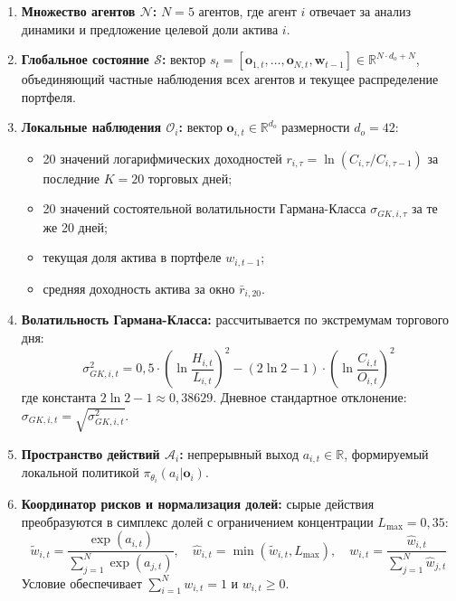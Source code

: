 \documentclass[11pt,a4paper]{article}
\begin{document}
\begin{enumerate}[leftmargin=*]
\item \textbf{Множество агентов $\mathcal{N}$:} $N = 5$ агентов, где агент $i$ отвечает за анализ динамики и предложение целевой доли актива $i$.

\item \textbf{Глобальное состояние $\mathcal{S}$:} вектор $s_t = [\mathbf{o}_{1, t}, \dots, \mathbf{o}_{N, t}, \mathbf{w}_{t-1}] \in \mathbb{R}^{N \cdot d_o + N}$, объединяющий частные наблюдения всех агентов и текущее распределение портфеля.

\item \textbf{Локальные наблюдения $\mathcal{O}_i$:} вектор $\mathbf{o}_{i, t} \in \mathbb{R}^{d_o}$ размерности $d_o = 42$:
\begin{itemize}
\item 20 значений логарифмических доходностей $r_{i, \tau} = \ln(C_{i, \tau} / C_{i, \tau-1})$ за последние $K=20$ торговых дней;
\item 20 значений состоятельной волатильности Гармана-Класса $\sigma_{GK, i, \tau}$ за те же 20 дней;
\item текущая доля актива в портфеле $w_{i, t-1}$;
\item средняя доходность актива за окно $\bar{r}_{i, 20}$.
\end{itemize}

\item \textbf{Волатильность Гармана-Класса:} рассчитывается по экстремумам торгового дня:
$$\sigma_{GK, i, t}^2 = 0{,}5 \cdot \left( \ln \frac{H_{i, t}}{L_{i, t}} \right)^2 - (2\ln 2 - 1) \cdot \left( \ln \frac{C_{i, t}}{O_{i, t}} \right)^2$$
где константа $2\ln 2 - 1 \approx 0{,}38629$. Дневное стандартное отклонение: $\sigma_{GK, i, t} = \sqrt{\sigma_{GK, i, t}^2}$.

\item \textbf{Пространство действий $\mathcal{A}_i$:} непрерывный выход $a_{i, t} \in \mathbb{R}$, формируемый локальной политикой $\pi_{\theta_i}(a_i | \mathbf{o}_i)$.

\item \textbf{Координатор рисков и нормализация долей:} сырые действия преобразуются в симплекс долей с ограничением концентрации $L_{\max} = 0{,}35$:
$$\tilde{w}_{i, t} = \frac{\exp(a_{i, t})}{\sum_{j=1}^N \exp(a_{j, t})}, \quad \hat{w}_{i, t} = \min(\tilde{w}_{i, t}, L_{\max}), \quad w_{i, t} = \frac{\hat{w}_{i, t}}{\sum_{j=1}^N \hat{w}_{j, t}}$$
Условие обеспечивает $\sum_{i=1}^N w_{i, t} = 1$ и $w_{i, t} \ge 0$.


\end{enumerate}
\end{document}
